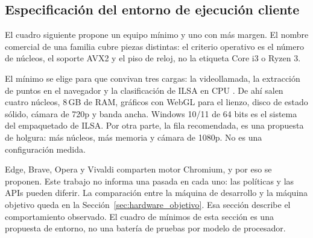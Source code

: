 \subsection{Especificación del entorno de ejecución cliente}
\label{sec:entorno_cliente}
El cuadro siguiente propone un equipo mínimo y uno con más margen. El nombre comercial de una familia cubre piezas distintas: el criterio operativo es el número de núcleos, el soporte AVX2 y el piso de reloj, no la etiqueta Core i3 o Ryzen 3.

El mínimo se elige para que convivan tres cargas: la videollamada, la extracción de puntos en el navegador y la clasificación de ILSA en CPU \parencite{chrome2024manifestv3}. De ahí salen cuatro núcleos, 8\,GB de RAM, gráficos con WebGL para el lienzo, disco de estado sólido, cámara de 720p y banda ancha. Windows 10/11 de 64 bits es el sistema del empaquetado de ILSA. Por otra parte, la fila recomendada, es una propuesta de holgura: más núcleos, más memoria y cámara de 1080p. No es una configuración medida.

Edge, Brave, Opera y Vivaldi comparten motor Chromium, y por eso se proponen. Este trabajo no informa una pasada en cada uno: las políticas y las APIs pueden diferir. La comparación entre la máquina de desarrollo y la máquina objetivo queda en la Sección~\ref{sec:hardware_objetivo}. Esa sección describe el comportamiento observado. El cuadro de mínimos de esta sección es una propuesta de entorno, no una batería de pruebas por modelo de procesador.



